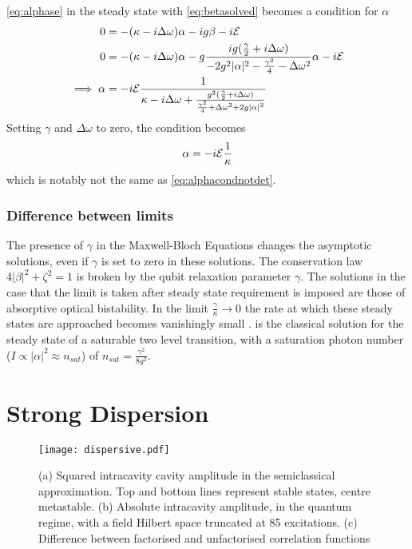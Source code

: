 \cref{eq:alphase} in the steady state with  \cref{eq:betasolved} becomes a condition for $\alpha$
\begin{align} %
  0&=-(\kappa-i\Delta\omega)\alpha-ig\beta-i\Epsilon \\
  0&=-{(\kappa-i\Delta\omega)}\alpha-g\frac{ig(\frac{\gamma}{2}+i\Delta\omega)}{-2g^2|\alpha|^2-\frac{\gamma^2}{4}-\Delta\omega^2}\alpha-i\Epsilon \\
\implies \alpha &= -i\Epsilon \frac{1}{\kappa-i\Delta\omega+\frac{g^2(\frac{\gamma}{2}+i\Delta\omega)}{\frac{\gamma^2}{4}+{\Delta\omega}^2+2g{|\alpha|}^2}}\label{eq:alphadetdiss}
\end{align}
Setting $\gamma$ and $\Delta\omega$ to zero, the condition becomes
\begin{equation}
  \alpha = -i\mathcal{E}\frac{1}{\kappa}
\end{equation}
which is notably not the same as \cref{eq:alphacondnotdet}.
\subsubsection{Difference between limits}
The presence of $\gamma$ in the Maxwell-Bloch Equations changes the asymptotic solutions, even if $\gamma$ is set to zero in these solutions.
The conservation law $4|\beta|^2 +\zeta^2 = 1$ is broken by the qubit relaxation parameter $\gamma$.
The solutions in the case that the limit is taken after steady state requirement is imposed are those of absorptive optical bistability.
In the limit $\frac{\gamma}{\kappa} \rightarrow 0$ the rate at which these steady states are approached becomes vanishingly small
\cite{Alsing1990}.
 is the classical solution for the steady state of a saturable two level transition, with a saturation photon number ($I \propto |\alpha|^2 \approx n_{sat}$) of $n_{sat} = \frac{\gamma^2}{8g^2}$.

\section{Strong Dispersion}
\begin{figure*}[ht]
    \label{dispersive}
    \texttt{[image: dispersive.pdf]}
    \caption{(a) Squared intracavity cavity amplitude in the semiclassical approximation. Top and bottom lines represent stable states, centre metastable. (b) Absolute intracavity amplitude, in the quantum regime, with a field Hilbert space truncated at 85 excitations. (c) Difference between factorised and unfactorised correlation functions}
\end{figure*}
